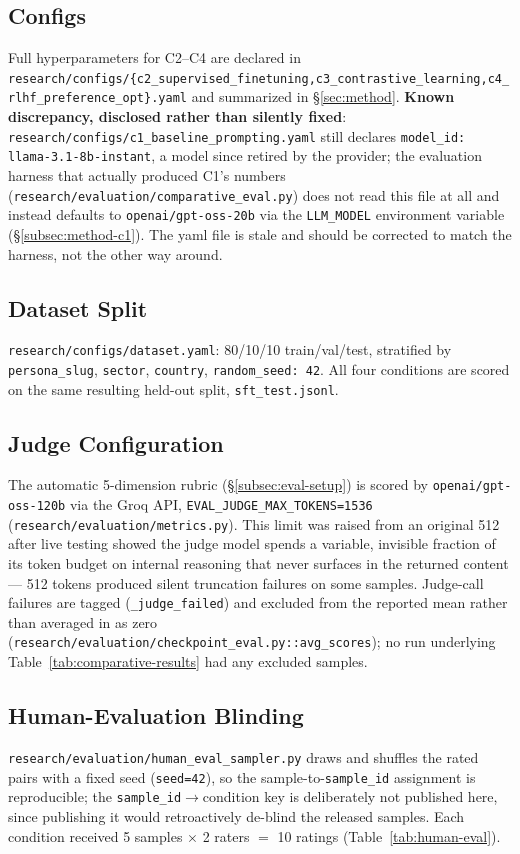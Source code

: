 \subsection{Configs}
\label{subsec:appendix-configs}
Full hyperparameters for C2--C4 are declared in \texttt{research/configs/\{c2\_supervised\_finetuning,c3\_contrastive\_learning,c4\_rlhf\_preference\_opt\}.yaml} and summarized in \S\ref{sec:method}. \textbf{Known discrepancy, disclosed rather than silently fixed}: \texttt{research/configs/c1\_baseline\_prompting.yaml} still declares \texttt{model\_id: llama-3.1-8b-instant}, a model since retired by the provider; the evaluation harness that actually produced C1's numbers (\texttt{research/evaluation/comparative\_eval.py}) does not read this file at all and instead defaults to \texttt{openai/gpt-oss-20b} via the \texttt{LLM\_MODEL} environment variable (\S\ref{subsec:method-c1}). The yaml file is stale and should be corrected to match the harness, not the other way around.

\subsection{Dataset Split}
\label{subsec:appendix-dataset}
\texttt{research/configs/dataset.yaml}: 80/10/10 train/val/test, stratified by \texttt{persona\_slug}, \texttt{sector}, \texttt{country}, \texttt{random\_seed: 42}. All four conditions are scored on the same resulting held-out split, \texttt{sft\_test.jsonl}.

\subsection{Judge Configuration}
\label{subsec:appendix-judge}
The automatic 5-dimension rubric (\S\ref{subsec:eval-setup}) is scored by \texttt{openai/gpt-oss-120b} via the Groq API, \texttt{EVAL\_JUDGE\_MAX\_TOKENS=1536} (\texttt{research/evaluation/metrics.py}). This limit was raised from an original 512 after live testing showed the judge model spends a variable, invisible fraction of its token budget on internal reasoning that never surfaces in the returned content — 512 tokens produced silent truncation failures on some samples. Judge-call failures are tagged (\texttt{\_judge\_failed}) and excluded from the reported mean rather than averaged in as zero (\texttt{research/evaluation/checkpoint\_eval.py::avg\_scores}); no run underlying Table~\ref{tab:comparative-results} had any excluded samples.

\subsection{Human-Evaluation Blinding}
\label{subsec:appendix-human-eval}
\texttt{research/evaluation/human\_eval\_sampler.py} draws and shuffles the rated pairs with a fixed seed (\texttt{seed=42}), so the sample-to-\texttt{sample\_id} assignment is reproducible; the \texttt{sample\_id}$\to$condition key is deliberately not published here, since publishing it would retroactively de-blind the released samples. Each condition received 5 samples $\times$ 2 raters $=$ 10 ratings (Table~\ref{tab:human-eval}).

